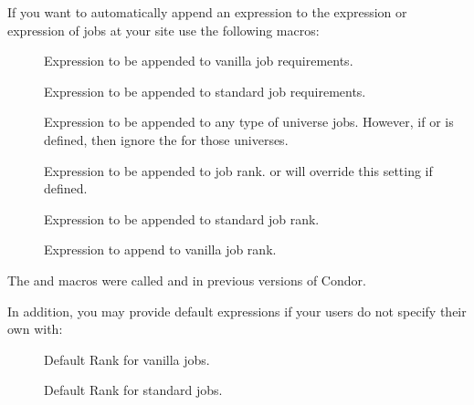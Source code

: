 If you want  to automatically append an expression to
the  expression or  expression of 
jobs at your site use the following macros:
\begin{description}
  
\item[] \label{param:AppendReqVanilla}
  Expression to be appended to vanilla job requirements.
  
\item[] \label{param:AppendReqStandard}
  Expression to be appended to standard job requirements.

\item[] \label{param:AppendReq}
  Expression to be appended to any type of universe jobs. 
  However, if  or 
  is defined, then ignore the  for those
  universes.

\item[] \label{param:AppendRank}
  Expression to be appended to job rank.   or
     will override this setting if defined.

\item[] \label{param:AppendRankStandard}
  Expression to be appended to standard job rank.

\item[] \label{param:AppendRankVanilla}
  Expression to append to vanilla job rank.

\end{description}

\Note The  and 
 macros were called
 and
 in previous versions of Condor.

In addition, you may provide default  expressions if your users
do not specify their own with:

\begin{description}

\item[] \label{param:DefaultRankVanilla}
  Default Rank for vanilla jobs.  

\item[] \label{param:DefaultRankStandard}
  Default Rank for standard jobs.


\end{description}

